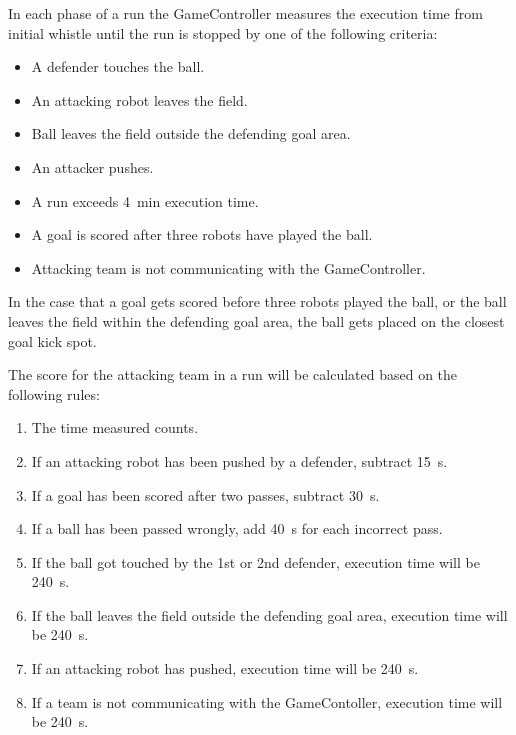         In each phase of a run the GameController measures the execution time from initial whistle until the run is stopped by one of the following criteria:

        \begin{itemize}
            \item A defender touches the ball.
            \item An attacking robot leaves the field.
            \item Ball leaves the field outside the defending goal area.
            \item An attacker pushes.
            \item A run exceeds \qty{4}{\minute} execution time.
            \item A goal is scored after three robots have played the ball.
            \item Attacking team is not communicating with the GameController.
        \end{itemize}

        In the case that a goal gets scored before three robots played the ball, or the ball leaves the field within the defending goal area, the ball gets placed on the closest goal kick spot.

        The score for the attacking team in a run will be calculated based on the following rules:

        \begin{enumerate}
            \item The time measured counts.
            \item If an attacking robot has been pushed by a defender, subtract \qty{15}{\second}.
            \item If a goal has been scored after two passes, subtract \qty{30}{\second}.
            \item If a ball has been passed wrongly, add \qty{40}{\second} for each incorrect pass.
            \item If the ball got touched by the 1st or 2nd defender, execution time will be \qty{240}{\second}.
            \item If the ball leaves the field outside the defending goal area, execution time will be \qty{240}{\second}.
            \item If an attacking robot has pushed, execution time will be \qty{240}{\second}.
            \item If a team is not communicating with the GameContoller, execution time will be \qty{240}{\second}.
        \end{enumerate}

